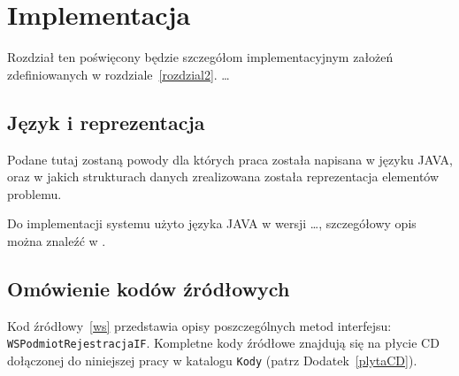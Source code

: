 \chapter{Implementacja}
\thispagestyle{chapterBeginStyle}

{\color{dgray}
Rozdział ten poświęcony będzie szczegółom implementacyjnym założeń zdefiniowanych w rozdziale~\ref{rozdzial2}. \ldots
}

\section{Język i reprezentacja}

{\color{dgray}
Podane tutaj zostaną powody dla których praca została napisana w języku JAVA, oraz w jakich strukturach danych zrealizowana została reprezentacja elementów problemu.
}

{\color{dgray}
Do implementacji systemu użyto języka JAVA w wersji \ldots, szczegółowy opis można znaleźć w \cite{Java}.
}

\section{Omówienie kodów źródłowych}

{\color{dgray}
Kod źródłowy~\ref{ws} przedstawia opisy poszczególnych metod interfejsu: \texttt{WSPodmiotRejestracjaIF}. Kompletne
kody źródłowe znajdują się na płycie CD dołączonej do niniejszej pracy w katalogu \texttt{Kody} (patrz Dodatek~\ref{plytaCD}).
}

